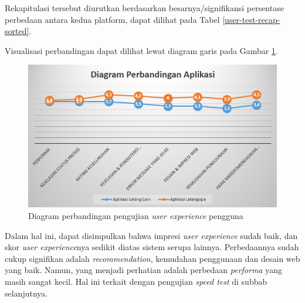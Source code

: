 \indent Rekapitulasi tersebut diurutkan berdasarkan besarnya/signifikansi persentase perbedaan antara kedua platform, dapat dilihat pada Tabel \ref{user-test-recap-sorted}.

Visualisasi perbandingan dapat dilihat lewat diagram garis pada Gambar \ref{diagram-pengguna-chart}.

\begin{figure}[H]
	\centering
	\includegraphics[width=\textwidth]{images/bab5/ujipengguna/chart.png}
	\caption{Diagram perbandingan pengujian \textit{user experience} pengguna}
	\label{diagram-pengguna-chart}
\end{figure}

Dalam hal ini, dapat disimpulkan bahwa impresi \textit{user experience} sudah baik, dan skor \textit{user experience}nya sedikit diatas sistem serupa lainnya. Perbedaannya sudah cukup signifikan adalah \textit{recommendation}, kemudahan penggunaan dan desain web yang baik. Namun, yang menjadi perhatian adalah perbedaan \textit{performa} yang masih sangat kecil. Hal ini terkait dengan pengujian \textit{speed test} di subbab selanjutnya.